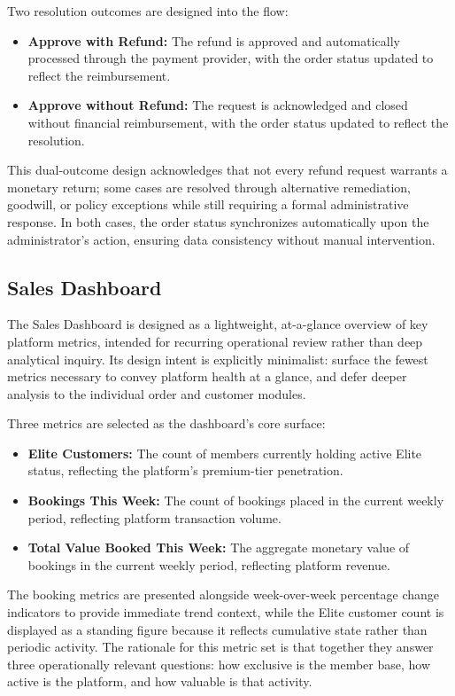 Two resolution outcomes are designed into the flow:
\begin{itemize}
    \item \textbf{Approve with Refund:} The refund is approved and automatically processed through the payment provider, with the order status updated to reflect the reimbursement.
    \item \textbf{Approve without Refund:} The request is acknowledged and closed without financial reimbursement, with the order status updated to reflect the resolution.
\end{itemize}
This dual-outcome design acknowledges that not every refund request warrants a monetary return; some cases are resolved through alternative remediation, goodwill, or policy exceptions while still requiring a formal administrative response. In both cases, the order status synchronizes automatically upon the administrator's action, ensuring data consistency without manual intervention.

\subsection{Sales Dashboard}
\label{subsection:Sales Dashboard}
The Sales Dashboard is designed as a lightweight, at-a-glance overview of key platform metrics, intended for recurring operational review rather than deep analytical inquiry. Its design intent is explicitly minimalist: surface the fewest metrics necessary to convey platform health at a glance, and defer deeper analysis to the individual order and customer modules.

Three metrics are selected as the dashboard's core surface:

\begin{itemize}
    \item \textbf{Elite Customers:} The count of members currently holding active Elite status, reflecting the platform's premium-tier penetration.
    \item \textbf{Bookings This Week:} The count of bookings placed in the current weekly period, reflecting platform transaction volume.
    \item \textbf{Total Value Booked This Week:} The aggregate monetary value of bookings in the current weekly period, reflecting platform revenue.
\end{itemize}
The booking metrics are presented alongside week-over-week percentage change indicators to provide immediate trend context, while the Elite customer count is displayed as a standing figure because it reflects cumulative state rather than periodic activity. The rationale for this metric set is that together they answer three operationally relevant questions: how exclusive is the member base, how active is the platform, and how valuable is that activity.

